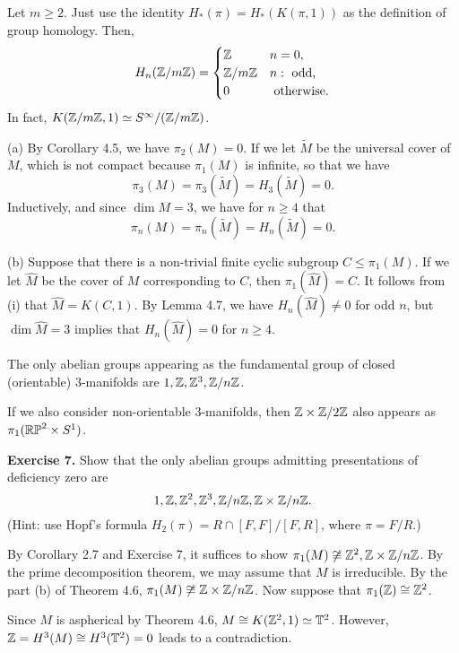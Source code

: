 \documentclass{../../small}
\begin{document}
\begin{lem}
Let $m\ge2$.
Just use the identity $H_*(\pi)=H_*(K(\pi,1))$ as the definition of group homology.
Then,
\[H_n(\mathbb{Z}/m\mathbb{Z})=\begin{cases}\mathbb{Z}&n=0,\\\mathbb{Z}/m\mathbb{Z}&n:\text{ odd,}\\0&\text{ otherwise.}\end{cases}\]
In fact, $K(\mathbb{Z}/m\mathbb{Z},1)\simeq S^\infty/(\mathbb{Z}/m\mathbb{Z})$.
\end{lem}
\begin{pf}
(a)
By Corollary 4.5, we have $\pi_2(M)=0$.
If we let $\tilde M$ be the universal cover of $M$, which is not compact because $\pi_1(M)$ is infinite, so that we have
\[\pi_3(M)=\pi_3(\tilde M)=H_3(\tilde M)=0.\]
Inductively, and since $\dim M=3$, we have for $n\ge4$ that
\[\pi_n(M)=\pi_n(\tilde M)=H_n(\tilde M)=0.\]

(b)
Suppose that there is a non-trivial finite cyclic subgroup $C\le\pi_1(M)$.
If we let $\hat M$ be the cover of $M$ corresponding to $C$, then $\pi_1(\hat M)=C$.
It follows from (i) that $\hat M=K(C,1)$.
By Lemma 4.7, we have $H_n(\hat M)\ne0$ for odd $n$, but $\dim\hat M=3$ implies that $H_n(\hat M)=0$ for $n\ge4$.
\end{pf}
\begin{thm}
The only abelian groups appearing as the fundamental group of closed (orientable) 3-manifolds are $1,\mathbb{Z},\mathbb{Z}^3,\mathbb{Z}/n\mathbb{Z}$.
\end{thm}
\begin{rmk*}
If we also consider non-orientable 3-manifolds, then $\mathbb{Z}\times\mathbb{Z}/2\mathbb{Z}$ also appears as $\pi_1(\mathbb{RP}^2\times S^1)$.
\end{rmk*}

\noindent\textbf{Exercise 7.}
Show that the only abelian groups admitting presentations of deficiency zero are
\[1,\mathbb{Z},\mathbb{Z}^2,\mathbb{Z}^3,\mathbb{Z}/n\mathbb{Z},\mathbb{Z}\times\mathbb{Z}/n\mathbb{Z}.\]
(Hint: use Hopf's formula $H_2(\pi)=R\cap[F,F]/[F,R]$, where $\pi=F/R$.)


\begin{pf}
By Corollary 2.7 and Exercise 7, it suffices to show $\pi_1(M)\not\cong\mathbb{Z}^2,\mathbb{Z}\times\mathbb{Z}/n\mathbb{Z}$.
By the prime decomposition theorem, we may assume that $M$ is irreducible.
By the part (b) of Theorem 4.6, $\pi_1(M)\not\cong\mathbb{Z}\times\mathbb{Z}/n\mathbb{Z}$.
Now suppose that $\pi_1(\mathbb{Z})\cong\mathbb{Z}^2$.

Since $M$ is aspherical by Theorem 4.6, $M\cong K(\mathbb{Z}^2,1)\simeq\mathbb{T}^2$.
However, $\mathbb{Z}=H^3(M)\cong H^3(\mathbb{T}^2)=0$ leads to a contradiction.
\end{pf}
\end{document}
